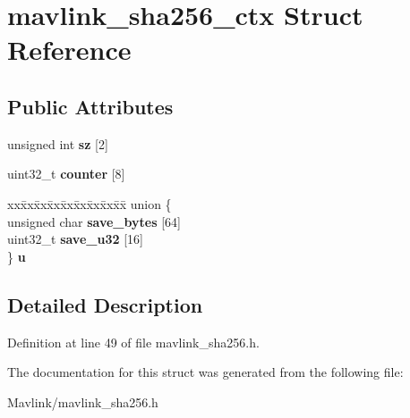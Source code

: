 \hypertarget{structmavlink__sha256__ctx}{}\section{mavlink\+\_\+sha256\+\_\+ctx Struct Reference}
\label{structmavlink__sha256__ctx}
\subsection*{Public Attributes}
\begin{DoxyCompactItemize}
\item 
\hypertarget{structmavlink__sha256__ctx_ab9af7ea753e55df15d6909c1ed606aa8}{}\label{structmavlink__sha256__ctx_ab9af7ea753e55df15d6909c1ed606aa8} 
unsigned int {\bfseries sz} \mbox{[}2\mbox{]}
\item 
\hypertarget{structmavlink__sha256__ctx_ac11ac388c0a250e0d72ff7613cb5c6d3}{}\label{structmavlink__sha256__ctx_ac11ac388c0a250e0d72ff7613cb5c6d3} 
uint32\+\_\+t {\bfseries counter} \mbox{[}8\mbox{]}
\item 
\hypertarget{structmavlink__sha256__ctx_a894b92b207d3d42886a7ad4bd8d9231e}{}\label{structmavlink__sha256__ctx_a894b92b207d3d42886a7ad4bd8d9231e} 
\begin{tabbing}
xx\=xx\=xx\=xx\=xx\=xx\=xx\=xx\=xx\=\kill
union \{\\
\>unsigned char {\bfseries save\_bytes} \mbox{[}64\mbox{]}\\
\>uint32\_t {\bfseries save\_u32} \mbox{[}16\mbox{]}\\
\} {\bfseries u}\\

\end{tabbing}\end{DoxyCompactItemize}


\subsection{Detailed Description}


Definition at line 49 of file mavlink\+\_\+sha256.\+h.



The documentation for this struct was generated from the following file\+:\begin{DoxyCompactItemize}
\item 
Mavlink/mavlink\+\_\+sha256.\+h\end{DoxyCompactItemize}
